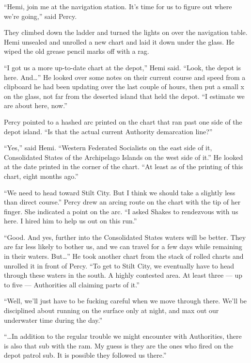 \documentclass[
]{scrbook}
\begin{document}
``Hemi, join me at the navigation station. It's time for us to figure
out where we're going,'' said Percy.

They climbed down the ladder and turned the lights on over the
navigation table. Hemi unsealed and unrolled a new chart and laid it
down under the glass. He wiped the old grease pencil marks off with a
rag.

``I got us a more up-to-date chart at the depot,'' Hemi said. ``Look,
the depot is here. And\ldots{}'' He looked over some notes on their
current course and speed from a clipboard he had been updating over the
last couple of hours, then put a small x on the glass, not far from the
deserted island that held the depot. ``I estimate we are about here,
now.''

Percy pointed to a hashed arc printed on the chart that ran past one
side of the depot island. ``Is that the actual current Authority
demarcation line?''

``Yes,'' said Hemi. ``Western Federated Socialists on the east side of
it, Consolidated States of the Archipelago Islands on the west side of
it.'' He looked at the date printed in the corner of the chart. ``At
least as of the printing of this chart, eight months ago.''

``We need to head toward Stilt City. But I think we should take a
slightly less than direct course.'' Percy drew an arcing route on the
chart with the tip of her finger. She indicated a point on the arc. ``I
asked Shakes to rendezvous with us here. I hired him to help us out on
this run.''

``Good. And yes, further into the Consolidated States waters will be
better. They are far less likely to bother us, and we can travel for a
few days while remaining in their waters. But\ldots{}'' He took another
chart from the stack of rolled charts and unrolled it in front of Percy.
``To get to Stilt City, we eventually have to head through these waters
in the south. A highly contested area. At least three --- up to five ---
Authorities all claiming parts of it.''

``Well, we'll just have to be fucking careful when we move through
there. We'll be disciplined about running on the surface only at night,
and max out our underwater time during the day.''

``\ldots In addition to the regular trouble we might encounter with
Authorities, there is also that sub with the ram. My guess is they are
the ones who fired on the depot patrol sub. It is possible they followed
us there.''
\end{document}
